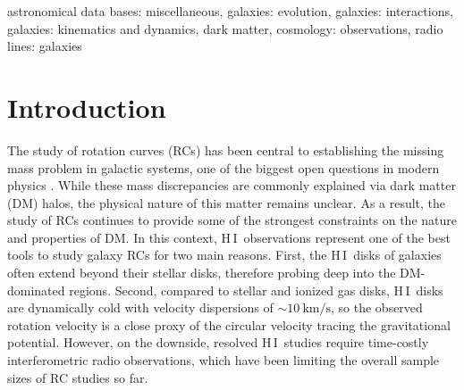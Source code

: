 \documentclass{iau}
\newcommand{\hi}{{\rm H}\,{\small\rm I}}
\begin{document}
\begin{keywords}
    astronomical data bases: miscellaneous, galaxies: evolution, galaxies: interactions, galaxies: kinematics and dynamics, dark matter, cosmology: observations, radio lines: galaxies
\end{keywords}

\maketitle

\section{Introduction}

The study of rotation curves (RCs) has been central to establishing the missing mass problem in galactic systems, one of the biggest open questions in modern physics \citep{Rubin1978, Bosma1981, vanAlbada1985}. While these mass discrepancies are commonly explained via dark matter (DM) halos, the physical nature of this matter remains unclear. As a result, the study of RCs continues to provide some of the strongest constraints on the nature and properties of DM. In this context, \hi\ observations represent one of the best tools to study galaxy RCs for two main reasons. First, the \hi\ disks of galaxies often extend beyond their stellar disks, therefore probing deep into the DM-dominated regions. Second, compared to stellar and ionized gas disks, \hi\ disks are dynamically cold with velocity dispersions of ${\sim}\SI{10}{\kilo\meter\per\second}$, so the observed rotation velocity is a close proxy of the circular velocity tracing the gravitational potential. However, on the downside, resolved \hi\ studies require time-costly interferometric radio observations, which have been limiting the overall sample sizes of RC studies so far.
\end{document}
